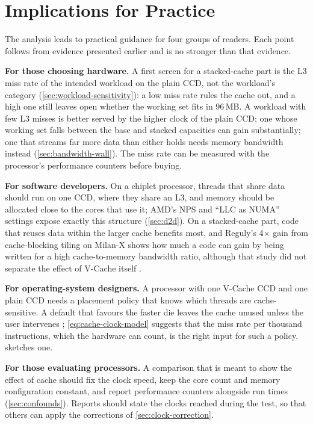 \section{Implications for Practice}
\label{sec:implications}
The analysis leads to practical guidance for four groups of readers. Each point follows from evidence presented earlier and is no stronger than that evidence.

\textbf{For those choosing hardware.} A first screen for a stacked-cache part is the L3 miss rate of the intended workload on the plain CCD, not the workload's category (\cref{sec:workload-sensitivity}): a low miss rate rules the cache out, and a high one still leaves open whether the working set fits in 96\,MB. A workload with few L3 misses is better served by the higher clock of the plain CCD; one whose working set falls between the base and stacked capacities can gain substantially; one that streams far more data than either holds needs memory bandwidth instead (\cref{sec:bandwidth-wall}). The miss rate can be measured with the processor's performance counters before buying.

\textbf{For software developers.} On a chiplet processor, threads that share data should run on one CCD, where they share an L3, and memory should be allocated close to the cores that use it; AMD's NPS and ``LLC as NUMA'' settings expose exactly this structure (\cref{sec:d2d}). On a stacked-cache part, code that reuses data within the larger cache benefits most, and Reguly's 4$\times$ gain from cache-blocking tiling on Milan-X shows how much a code can gain by being written for a high cache-to-memory bandwidth ratio, although that study did not separate the effect of V-Cache itself \cite{regulyComparativeEvaluationBandwidthbound2023}.

\textbf{For operating-system designers.} A processor with one V-Cache CCD and one plain CCD needs a placement policy that knows which threads are cache-sensitive. A default that favours the faster die leaves the cache unused unless the user intervenes \cite{lamAMDs7950X3DZen2023}; \cref{eq:cache-clock-model} suggests that the miss rate per thousand instructions, which the hardware can count, is the right input for such a policy.  sketches one.




\textbf{For those evaluating processors.} A comparison that is meant to show the effect of cache should fix the clock speed, keep the core count and memory configuration constant, and report performance counters alongside run times (\cref{sec:confounds}). Reports should state the clocks reached during the test, so that others can apply the corrections of \cref{sec:clock-correction}.

